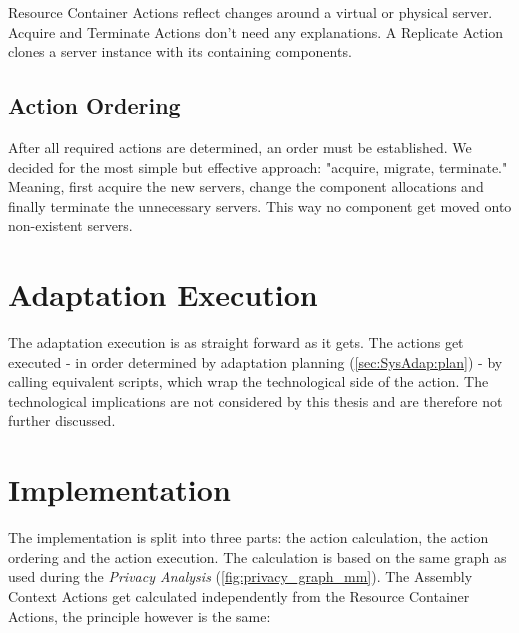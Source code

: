 Resource Container Actions reflect changes around a virtual or physical server. Acquire and Terminate Actions don't need any explanations. A Replicate Action clones a server instance with its containing components.

\subsection{Action Ordering}

After all required actions are determined, an order must be established. We decided for the most simple but effective approach: "acquire, migrate, terminate." Meaning, first acquire the new servers, change the component allocations and finally terminate the unnecessary servers. This way no component get moved onto non-existent servers.



\section{Adaptation Execution}
\label{sec:SysAdap:exec}

The adaptation execution is as straight forward as it gets. The actions get executed - in order determined by adaptation planning (\autoref{sec:SysAdap:plan}) - by calling equivalent scripts, which wrap the technological side of the action. The technological implications are not considered by this thesis and are therefore not further discussed.



\section{Implementation}
\label{sec:SysAdap:impl}


The implementation is split into three parts: the action calculation, the action ordering and the action execution. The calculation is based on the same graph as used during the \textit{Privacy Analysis} (\autoref{fig:privacy_graph_mm}). The Assembly Context Actions get calculated independently from the Resource Container Actions, the principle however is the same:

